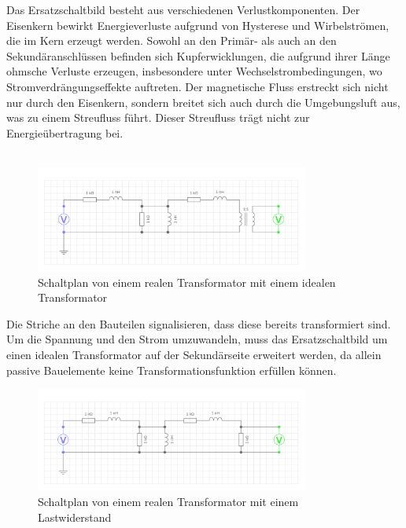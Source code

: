 \begin{enumerate}[label=\alph*)]
\begin{figure}[h!]
  \end{figure}
  Das Ersatzschaltbild besteht aus verschiedenen Verlustkomponenten. Der Eisenkern bewirkt Energieverluste aufgrund von Hysterese und Wirbelströmen, die im Kern erzeugt werden. Sowohl an den Primär- als auch an den Sekundäranschlüssen befinden sich Kupferwicklungen, die aufgrund ihrer Länge ohmsche Verluste erzeugen, insbesondere unter Wechselstrombedingungen, wo Stromverdrängungseffekte auftreten. Der magnetische Fluss erstreckt sich nicht nur durch den Eisenkern, sondern breitet sich auch durch die Umgebungsluft aus, was zu einem Streufluss führt. Dieser Streufluss trägt nicht zur Energieübertragung bei.\\ \ \\
  \begin{figure}[h!]
  	\begin{center}
  		\includegraphics[width=0.8\textwidth]{img/2.1.2.2.png}
  	\end{center}
  	\caption{Schaltplan von einem realen Transformator mit einem idealen Transformator}\label{img/2.1.2.2}
  \end{figure}
  Die Striche an den Bauteilen signalisieren, dass diese bereits transformiert sind. Um die Spannung und den Strom umzuwandeln, muss das Ersatzschaltbild um einen idealen Transformator auf der Sekundärseite erweitert werden, da allein passive Bauelemente keine Transformationsfunktion erfüllen können.\\
  \begin{figure}[h!]
  	\begin{center}
  		\includegraphics[width=0.8\textwidth]{img/2.1.2.3.png}
  	\end{center}
  	\caption{Schaltplan von einem realen Transformator mit einem Lastwiderstand}\label{img/2.1.2.3}
  \end{figure}


\end{enumerate}
